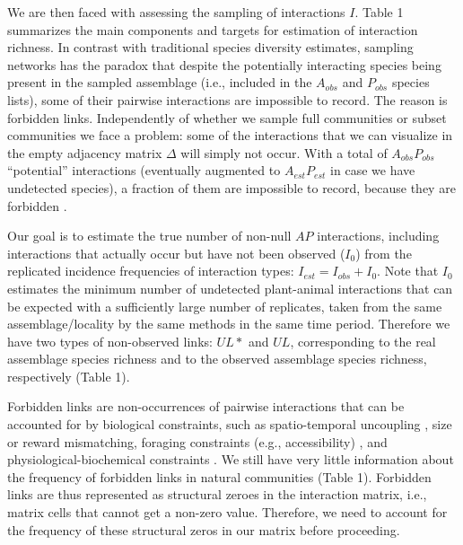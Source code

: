 \documentclass[12pt]{article}
\begin{document}
We are then faced with assessing the sampling of interactions $I$. Table 1 summarizes the main components and targets for estimation of interaction richness. In contrast with traditional species diversity estimates, sampling networks has the paradox that despite the potentially interacting species being present in the sampled assemblage (i.e., included in the $A_{obs}$ and $P_{obs}$ species lists), some of their pairwise interactions are impossible to record. The reason is forbidden links. Independently of whether we sample full communities or subset communities we face a problem: some of the interactions that we can visualize in the empty adjacency matrix $\Delta$ will simply not occur. With a total of $A_{obs}P_{obs}$ ``potential'' interactions (eventually augmented to $A_{est}P_{est}$ in case we have undetected species), a fraction of them are impossible to record, because they are forbidden \citep{E31.7324_PDF,Olesen:2011a}. 

Our goal is to estimate the true number of non-null $AP$ interactions, including interactions that actually occur but have not been observed ($I_0$) from the replicated incidence frequencies of interaction types: $I_{est} = I_{obs} + I_0$. Note that $I_0$ estimates the minimum number of undetected plant-animal interactions that can be expected with a sufficiently large number of replicates, taken from the same assemblage/locality by the same methods in the same time period. Therefore we have two types of non-observed links: $UL*$ and $UL$, corresponding to the real assemblage species richness and to the observed assemblage species richness, respectively (Table 1).  

Forbidden links are non-occurrences of pairwise interactions that can be accounted for by biological constraints, such as spatio-temporal uncoupling \citep{E31/2562}, size or reward mismatching, foraging constraints (e.g., accessibility) \citep{More:2012kx}, and physiological-biochemical constraints \citep{E31/2562}. We still have very little information about the frequency of forbidden links in natural communities \citep{E31.7324_PDF,Stang:2009cx,Vazquez:2009p82,Olesen:2011a,Ibanez:2012eu,Maruyama:2014gt,Vizentin-Bugoni:2014hc} (Table 1). Forbidden links are thus represented as structural zeroes in the interaction matrix, i.e., matrix cells that cannot get a non-zero value. Therefore, we need to account for the frequency of these structural zeros in our matrix before proceeding. 
\end{document}
